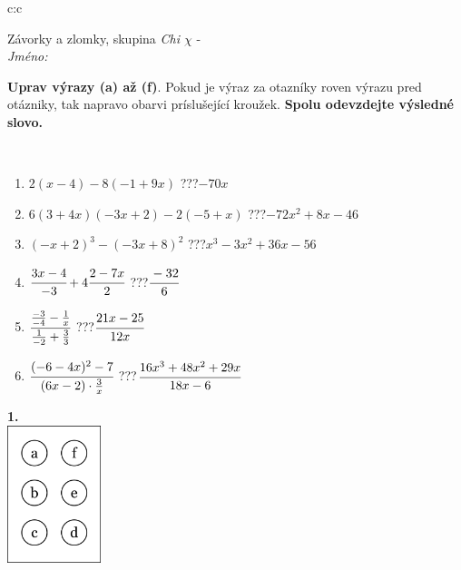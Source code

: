 \documentclass[10pt]{report}
\begin{document}
\begin{tabular}{c:c}
\begin{minipage}[c][104.5mm][t]{0.5\linewidth}
\begin{center}
\vspace{7mm}
{\huge Závorky a zlomky, skupina \textit{Chi $\chi$} -}\\[5mm]
\textit{Jméno:}\phantom{xxxxxxxxxxxxxxxxxxxxxxxxxxxxxxxxxxxxxxxxxxxxxxxxxxxxxxxxxxxxxxxxx}\\[5mm]
\begin{minipage}{0.95\linewidth}
\begin{center}
\textbf{Uprav výrazy (a) až (f)}. Pokud je výraz za otazníky roven výrazu pred otázniky, tak napravo obarvi príslušející kroužek. \textbf{Spolu odevzdejte výsledné slovo.}
\end{center}
\end{minipage}
\\[1mm]
\begin{minipage}{0.79\linewidth}
\begin{center}
\begin{varwidth}{\linewidth}
\begin{enumerate}
\normalsize
\item $2(x-4)-8(-1+9x)$\quad \dotfill\; ???\;\dotfill \quad $-70x$
\item $6(3+4x)(-3x+2)-2(-5+x)$\quad \dotfill\; ???\;\dotfill \quad $-72x^2+8x-46$
\item $(-x+2)^3-(-3x+8)^2$\quad \dotfill\; ???\;\dotfill \quad $x^3-3x^2+36x-56$
\item $\cfrac{3x-4}{-3}+4\cfrac{2-7x}{2}$\quad \dotfill\; ???\;\dotfill \quad $\cfrac{-32}{6}$
\item $\cfrac{\frac{-3}{-4}-\frac{1}{x}}{\frac{1}{-2}+\frac{3}{3}}$\quad \dotfill\; ???\;\dotfill \quad $\cfrac{21x-25}{12x}$
\item $\cfrac{(-6-4x)^2-7}{(6x-2)\cdot\frac{3}{x}}$\quad \dotfill\; ???\;\dotfill \quad $\cfrac{16x^3+48x^2+29x}{18x-6}$
\end{enumerate}
\end{varwidth}
\end{center}
\end{minipage}
\begin{minipage}{0.20\linewidth}
\begin{center}
{\Huge\bfseries 1.} \\[2mm]
\includegraphics[height=40mm]{../images/braille.png}

\end{center}
\end{minipage}
\end{center}
\end{minipage}
\end{tabular}
\end{document}
